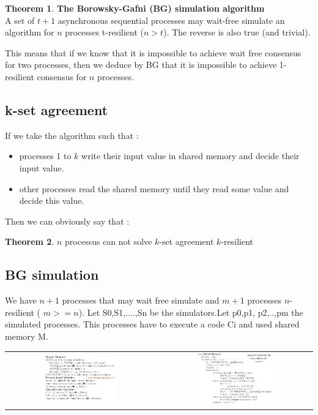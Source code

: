 \documentclass{article}
\theoremstyle{definition}
\newtheorem{theorem}{Theorem}
\begin{document}
\begin{theorem}\textbf{The Borowsky-Gafni (BG) simulation algorithm}\\
A set of $t + 1$ asynchronous sequential processes may wait-free simulate an algorithm for $n$ processes t-resilient ($n>t$). The reverse is also true (and trivial).
\end{theorem}

This means that if we know that it is impossible to achieve wait free consensus for two processes, then we deduce by BG that it is impossible to
achieve 1-resilient consensus for $n$ processes.

\subsection{k-set agreement}

If we take the algorithm such that :
\begin{itemize}
\item processes 1 to $k$ write their input value in shared memory and decide their input value.
\item other processes read the shared memory until they read some value and decide this value.
\end{itemize}
Then we can obviously say that :

\begin{theorem}
$n$ processus can not solve $k$-set agreement $k$-resilient
\end{theorem}

\subsection{BG simulation}

We have $n +1$ processes that may wait free simulate and $m +1$ processes $n$-resilient ( $m>=n$). Let S0,S1,....,Sn be the simulators.Let p0,p1, p2,..,pm the simulated processes. This processes have to execute a code Ci and used shared memory M.

\begin{center}
\begin{tabular}{c c}
\includegraphics[width=0.5\textwidth]{BG_1} &
\includegraphics[width=0.5\textwidth]{BG_2}
\end{tabular}
\end{center}
\end{document}
